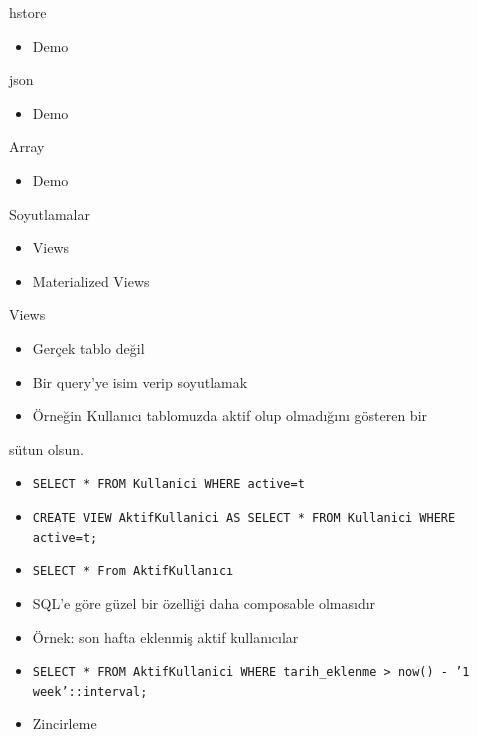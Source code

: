 \documentclass[presentation]{beamer}
\begin{document}
\begin{frame}[label=sec-26]{hstore}
\begin{itemize}
\item Demo
\end{itemize}
\end{frame}

\begin{frame}[label=sec-27]{json}
\begin{itemize}
\item Demo
\end{itemize}
\end{frame}

\begin{frame}[label=sec-28]{Array}
\begin{itemize}
\item Demo
\end{itemize}
\end{frame}

\begin{frame}[label=sec-29]{Soyutlamalar}
\begin{itemize}
\item Views
\item Materialized Views
\end{itemize}
\end{frame}

\begin{frame}[fragile,label=sec-30]{Views}
 \begin{itemize}
\item Gerçek tablo değil
\item Bir query'ye isim verip soyutlamak
\item Örneğin Kullanıcı tablomuzda aktif olup olmadığını gösteren bir
\end{itemize}
sütun olsun.
\begin{itemize}
\item \texttt{SELECT * FROM Kullanici WHERE active=t}
\item \texttt{CREATE VIEW AktifKullanici AS SELECT * FROM Kullanici WHERE active=t;}
\item \texttt{SELECT * From AktifKullanıcı}
\item SQL'e göre güzel bir özelliği daha composable olmasıdır
\item Örnek: son hafta eklenmiş aktif kullanıcılar
\item \texttt{SELECT * FROM AktifKullanici WHERE tarih\_eklenme > now() - '1 week'::interval;}
\item Zincirleme
\end{itemize}
\end{frame}
\end{document}
